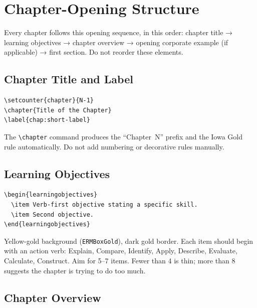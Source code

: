 \documentclass[11pt,openany]{book}
\newcommand{\code}[1]{\texttt{\small #1}}
\begin{document}
\section{Chapter-Opening Structure}
\label{sec:opening}

Every chapter follows this opening sequence, in this order: chapter title → learning objectives → chapter overview → opening corporate example (if applicable) → first section. Do not reorder these elements.

\subsection{Chapter Title and Label}

\begin{lstlisting}
\setcounter{chapter}{N-1}
\chapter{Title of the Chapter}
\label{chap:short-label}
\end{lstlisting}

The \code{\textbackslash chapter} command produces the ``Chapter~N'' prefix and the Iowa Gold rule automatically. Do not add numbering or decorative rules manually.

\subsection{Learning Objectives}

\begin{lstlisting}
\begin{learningobjectives}
  \item Verb-first objective stating a specific skill.
  \item Second objective.
\end{learningobjectives}
\end{lstlisting}

Yellow-gold background (\code{ERMBoxGold}), dark gold border. Each item should begin with an action verb: Explain, Compare, Identify, Apply, Describe, Evaluate, Calculate, Construct. Aim for 5--7 items. Fewer than 4 is thin; more than 8 suggests the chapter is trying to do too much.

\subsection{Chapter Overview}
\end{document}
